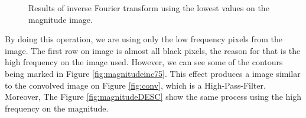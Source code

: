 \documentclass[12pt,a4paper]{article}
\begin{document}
\begin{itemize}
\begin{figure}[!h]
{{			}
			\label{fig:magnitudeinc50}
		}
		\quad
		
		\caption{Results of inverse Fourier transform using the lowest values on the magnitude image.}
		\label{fig:magnitudeINC}
	\end{figure}
		
	By doing this operation, we are using only the low frequency pixels from the image. The first row on image is almost all black pixels, the reason for that is the high frequency on the image used. However, we can see some of the contours being marked in Figure \ref{fig:magnitudeinc75}. This effect produces a image similar to the convolved image on Figure \ref{fig:conv}, which is a High-Pass-Filter. Moreover, The Figure \ref{fig:magnitudeDESC} show the same process using the high frequency on the magnitude.
	

\end{itemize}
\end{document}
